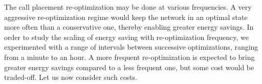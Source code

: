 %
%

The call placement re-optimization may be done at various frequencies. A very aggressive re-optimization regime would keep the network in an optimal state more often than a conservative one, thereby enabling greater energy savings. In order to study the scaling of energy saving with re-optimization frequency, we experimented with a range of intervals between successive optimizations, ranging from a minute to an hour. A more frequent re-optimization is expected to bring greater energy savings compared to a less frequent one, but some cost would be traded-off. Let us now consider such costs.

